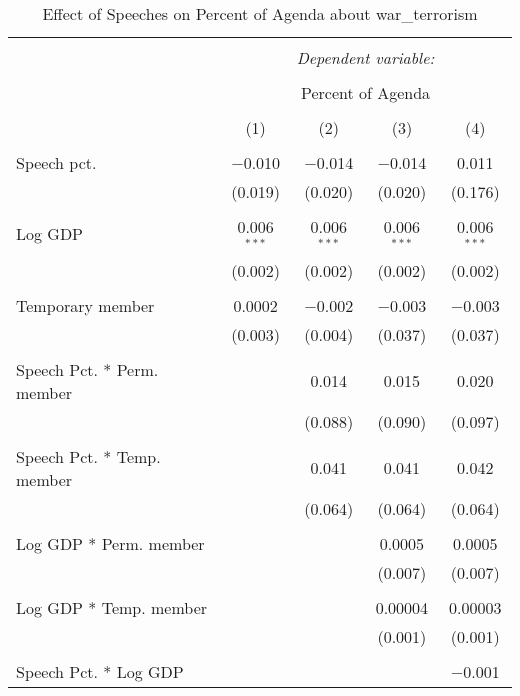 
\begin{table}[!htbp] \centering 
  \caption{Effect of Speeches on Percent of Agenda about  war_terrorism} 
  \label{} 
\begin{tabular}{@{\extracolsep{5pt}}lcccc} 
\\[-1.8ex]\hline 
\hline \\[-1.8ex] 
 & \multicolumn{4}{c}{\textit{Dependent variable:}} \\ 
\cline{2-5} 
\\[-1.8ex] & \multicolumn{4}{c}{Percent of Agenda} \\ 
\\[-1.8ex] & (1) & (2) & (3) & (4)\\ 
\hline \\[-1.8ex] 
 Speech pct. & $-$0.010 & $-$0.014 & $-$0.014 & 0.011 \\ 
  & (0.019) & (0.020) & (0.020) & (0.176) \\ 
  & & & & \\ 
 Log GDP & 0.006$^{***}$ & 0.006$^{***}$ & 0.006$^{***}$ & 0.006$^{***}$ \\ 
  & (0.002) & (0.002) & (0.002) & (0.002) \\ 
  & & & & \\ 
 Temporary member & 0.0002 & $-$0.002 & $-$0.003 & $-$0.003 \\ 
  & (0.003) & (0.004) & (0.037) & (0.037) \\ 
  & & & & \\ 
 Speech Pct. * Perm. member &  & 0.014 & 0.015 & 0.020 \\ 
  &  & (0.088) & (0.090) & (0.097) \\ 
  & & & & \\ 
 Speech Pct. * Temp. member &  & 0.041 & 0.041 & 0.042 \\ 
  &  & (0.064) & (0.064) & (0.064) \\ 
  & & & & \\ 
 Log GDP * Perm. member &  &  & 0.0005 & 0.0005 \\ 
  &  &  & (0.007) & (0.007) \\ 
  & & & & \\ 
 Log GDP * Temp. member &  &  & 0.00004 & 0.00003 \\ 
  &  &  & (0.001) & (0.001) \\ 
  & & & & \\ 
 Speech Pct. * Log GDP &  &  &  & $-$0.001 \\ 

\end{tabular}
\end{table}
